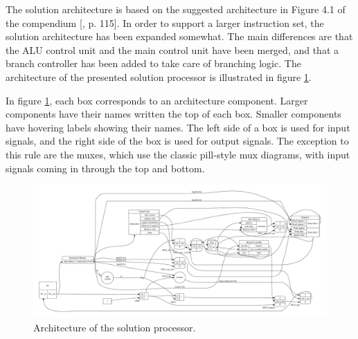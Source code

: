 The solution architecture is based on the suggested architecture in Figure 4.1 of the compendium [\cite{compendium}, p. 115].
In order to support a larger instruction set, the solution architecture has been expanded somewhat.
The main differences are that the ALU control unit and the main control unit have been merged, and that a branch controller has been added to take care of branching logic.
The architecture of the presented solution processor is illustrated in figure \ref{figure:cpu-architecture}.

In figure \ref{figure:cpu-architecture}, each box corresponds to an architecture component.
Larger components have their names written the top of each box.
Smaller components have hovering labels showing their names.
The left side of a box is used for input signals, and the right side of the box is used for output signals.
The exception to this rule are the muxes, which use the classic pill-style mux diagrams, with input signals coming in through the top and bottom.


\begin{figure}[h!]
	\begin{center}
		\includegraphics[keepaspectratio, height=\textheight, width=\textwidth]{graphics/cpu-architecture/cpu-architecture.pdf}
		\caption{Architecture of the solution processor.}
		\label{figure:cpu-architecture}
	\end{center}
\end{figure}
